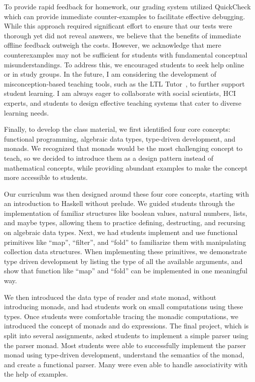 \documentclass[11pt,a4paper,sans]{moderncv} %
\begin{document}
To provide rapid feedback for homework, our grading system utilized QuickCheck which can provide immediate counter-examples to facilitate effective debugging. 
While this approach required significant effort to ensure that our tests were thorough yet did not reveal answers, we believe that the benefits of immediate offline feedback outweigh the costs. 
However, we acknowledge that mere counterexamples may not be sufficient for students with fundamental conceptual misunderstandings. 
To address this, we encouraged students to seek help online or in study groups. 
In the future, I am considering the development of misconception-based teaching tools, such as the LTL Tutor~\cite{plt_LTLTutor_2024}, to further support student learning. 
I am always eager to collaborate with social scientists, HCI experts, and students to design effective teaching systems that cater to diverse learning needs.

Finally, to develop the class material, we first identified four core concepts: functional programming, algebraic data types, type-driven development, and monads. 
We recognized that monads would be the most challenging concept to teach, so we decided to introduce them as a design pattern instead of mathematical concepts, while providing abundant examples to make the concept more accessible to students.

Our curriculum was then designed around these four core concepts, starting with an introduction to Haskell without prelude. 
We guided students through the implementation of familiar structures like boolean values, natural numbers, lists, and maybe types, allowing them to practice defining, destructing, and recursing on algebraic data types. 
Next, we had students implement and use functional primitives like ``map'', ``filter'', and ``fold'' to familiarize them with manipulating collection data structures.
When implementing these primitives, we demonstrate type driven development by listing the type of all the available arguments, and show that function like ``map'' and ``fold'' can be implemented in one meaningful way.

We then introduced the data type of reader and state monad, without introducing monads, and had students work on small computations using these types. 
Once students were comfortable tracing the monadic computations, we introduced the concept of monads and do expressions. 
The final project, which is split into several assignments, asked students to implement a simple parser using the parser monad. 
Most students were able to successfully implement the parser monad using type-driven development, understand the semantics of the monad, and create a functional parser. 
Many were even able to handle associativity with the help of examples.
\end{document}

